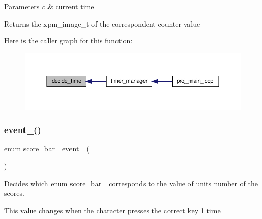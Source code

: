 \begin{DoxyParams}{Parameters}
{\em c} & current time\\
\hline
\end{DoxyParams}
\begin{DoxyReturn}{Returns}
the xpm\+\_\+image\+\_\+t of the correspondent counter value 
\end{DoxyReturn}
Here is the caller graph for this function\+:
\nopagebreak
\begin{figure}[H]
\begin{center}
\leavevmode
\includegraphics[width=350pt]{group__loading__xpms_ga5dbbff5de875a1305fdf7ed265fc73c8_icgraph}
\end{center}
\end{figure}
\mbox{\label{group__loading__xpms_ga70f5397af0d313815b96cf662cd48f65}} 
\subsubsection{\texorpdfstring{event\+\_()}{event\_1()}}
{\footnotesize\ttfamily enum \hyperlink{group__types_gab5d0fdad1621cc17d1147dedd2e7a773}{score\+\_\+bar\+\_} event\+\_ (\begin{DoxyParamCaption}{ }\end{DoxyParamCaption})}



Decides which enum score\+\_\+bar\+\_ corresponds to the value of units number of the scores. 

This value changes when the character presses the correct key 1 time

